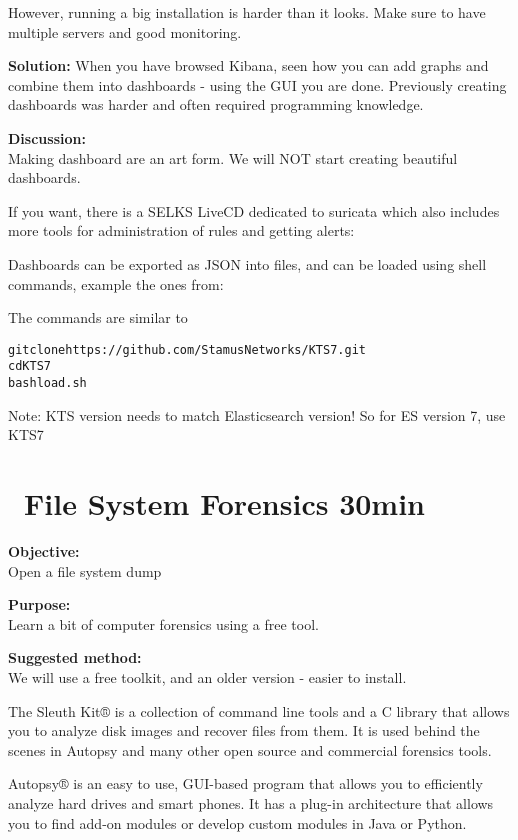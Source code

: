 \documentclass[a4paper,11pt,notitlepage]{report}
\begin{document}
However, running a big installation is harder than it looks. Make sure to have multiple servers and good monitoring.

{\bf Solution:}
When you have browsed Kibana, seen how you can add graphs and combine them into dashboards - using the GUI you are done. Previously creating dashboards was harder and often required programming knowledge.

{\bf Discussion:}\\
Making dashboard are an art form. We will NOT start creating beautiful dashboards.

If you want, there is a SELKS LiveCD dedicated to suricata which also includes more tools for administration of rules and getting alerts:\\

Dashboards can be exported as JSON into files, and can be loaded using shell commands, example the ones from:

The commands are similar to
\begin{alltt}
git clone https://github.com/StamusNetworks/KTS7.git
cd KTS7
bash load.sh
\end{alltt}

Note: KTS version needs to match Elasticsearch version! So for ES version 7, use KTS7




\chapter{\faExclamationTriangle\ File System Forensics 30min}
\label{ex:file-system-forensics}

{\bf Objective:}\\
 Open a file system dump

{\bf Purpose:}\\
Learn a bit of computer forensics using a free tool.

{\bf Suggested method:}\\
We will use a free toolkit, and an older version - easier to install.

The Sleuth Kit® is a collection of command line tools and a C library that allows you to analyze disk images and recover files from them. It is used behind the scenes in Autopsy and many other open source and commercial forensics tools.

Autopsy® is an easy to use, GUI-based program that allows you to efficiently analyze hard drives and smart phones. It has a plug-in architecture that allows you to find add-on modules or develop custom modules in Java or Python.
\end{document}
